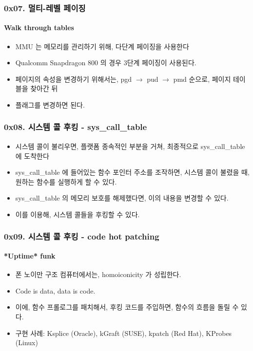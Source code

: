 \begin{frame}
  \frametitle{0x07. 멀티-레벨 페이징}
  \framesubtitle{Walk through tables}

  \begin{itemize}
  \item MMU 는 메모리를 관리하기 위해, 다단계 페이징을 사용한다
  \item Qualcomm Snapdragon 800 의 경우 3단계 페이징이 사용된다.
  \item 페이지의 속성을 변경하기 위해서는, pgd $\rightarrow$ pud $\rightarrow$ pmd 순으로, 페이지 테이블을 찾아간 뒤
  \item 플래그를 변경하면 된다.
  \end{itemize}
\end{frame}

\begin{frame}
  \frametitle{0x08. 시스템 콜 후킹 - sys\_call\_table}
  \framesubtitle{}

  \begin{itemize}
  \item 시스템 콜이 불리우면, 플랫폼 종속적인 부분을 거쳐, 최종적으로 sys\_call\_table 에 도착한다
  \item sys\_call\_table 에 들어있는 함수 포인터 주소를 조작하면, 시스템 콜이 불렸을 때, 원하는 함수를 실행하게 할 수 있다.
  \item sys\_call\_table 의 메모리 보호를 해제했다면, 이의 내용을 변경할 수 있다.
  \item 이를 이용해, 시스템 콜들을 후킹할 수 있다.
  \end{itemize}
\end{frame}

\begin{frame}
  \frametitle{0x09. 시스템 콜 후킹 - code hot patching}
  \framesubtitle{*Uptime* funk}

  \begin{itemize}
  \item 폰 노이만 구조 컴퓨터에서는, homoiconicity 가 성립한다.
  \item Code is data, data is code.
  \item 이에, 함수 프롤로그를 패치해서, 후킹 코드를 주입하면, 함수의 흐름을 돌릴 수 있다.
  \item 구현 사례: Ksplice (Oracle), kGraft (SUSE), kpatch (Red Hat), KProbes (Linux)
  \end{itemize}
\end{frame}

